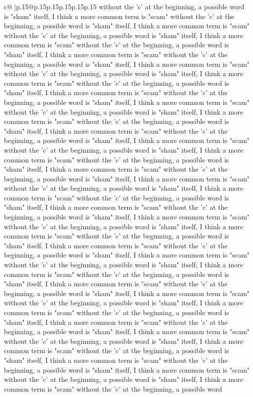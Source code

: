 \documentclass{article}
\begin{document}
{\begin{supertabular}{c@{$\;$}|p{.15\linewidth}@{}p{.15\linewidth}p{.15\linewidth}p{.15\linewidth}p{.15\linewidth}p{.15\linewidth}}
{{{without the 'c' at the beginning, a possible word is "sham" itself, I think a more common term is "scam" without the 'c' at the beginning, a possible word is "sham" itself, I think a more common term is "scam" without the 'c' at the beginning, a possible word is "sham" itself, I think a more common term is "scam" without the 'c' at the beginning, a possible word is "sham" itself, I think a more common term is "scam" without the 'c' at the beginning, a possible word is "sham" itself, I think a more common term is "scam" without the 'c' at the beginning, a possible word is "sham" itself, I think a more common term is "scam" without the 'c' at the beginning, a possible word is "sham" itself, I think a more common term is "scam" without the 'c' at the beginning, a possible word is "sham" itself, I think a more common term is "scam" without the 'c' at the beginning, a possible word is "sham" itself, I think a more common term is "scam" without the 'c' at the beginning, a possible word is "sham" itself, I think a more common term is "scam" without the 'c' at the beginning, a possible word is "sham" itself, I think a more common term is "scam" without the 'c' at the beginning, a possible word is "sham" itself, I think a more common term is "scam" without the 'c' at the beginning, a possible word is "sham" itself, I think a more common term is "scam" without the 'c' at the beginning, a possible word is "sham" itself, I think a more common term is "scam" without the 'c' at the beginning, a possible word is "sham" itself, I think a more common term is "scam" without the 'c' at the beginning, a possible word is "sham" itself, I think a more common term is "scam" without the 'c' at the beginning, a possible word is "sham" itself, I think a more common term is "scam" without the 'c' at the beginning, a possible word is "sham" itself, I think a more common term is "scam" without the 'c' at the beginning, a possible word is "sham" itself, I think a more common term is "scam" without the 'c' at the beginning, a possible word is "sham" itself, I think a more common term is "scam" without the 'c' at the beginning, a possible word is "sham" itself, I think a more common term is "scam" without the 'c' at the beginning, a possible word is "sham" itself, I think a more common term is "scam" without the 'c' at the beginning, a possible word is "sham" itself, I think a more common term is "scam" without the 'c' at the beginning, a possible word is "sham" itself, I think a more common term is "scam" without the 'c' at the beginning, a possible word is "sham" itself, I think a more common term is "scam" without the 'c' at the beginning, a possible word is "sham" itself, I think a more common term is "scam" without the 'c' at the beginning, a possible word is "sham" itself, I think a more common term is "scam" without the 'c' at the beginning, a possible word is "sham" itself, I think a more common term is "scam" without the 'c' at the beginning, a possible word is "sham" itself, I think a more common term is "scam" without the 'c' at the beginning, a possible word is "sham" itself, I think a more common term is "scam" without the 'c' at the beginning, a possible word }}}
\end{supertabular}}
\end{document}
